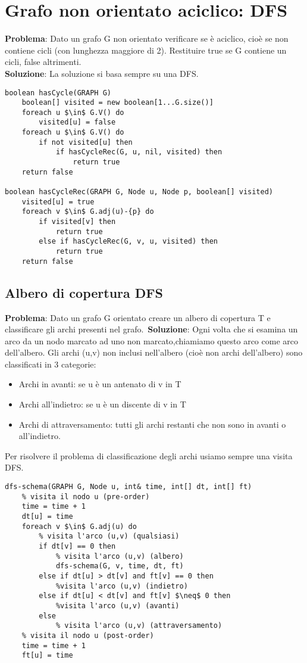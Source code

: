 \documentclass[../cheatSheetAlgoritmi.tex]{subfiles}
\begin{document}
\section{Grafo non orientato aciclico: DFS}
\textbf{Problema}: Dato un grafo G non orientato verificare se è aciclico, cioè se non contiene cicli (con lunghezza maggiore di 2). Restituire true se G contiene un cicli, false altrimenti.\\
\textbf{Soluzione}: La soluzione si basa sempre su una DFS. \
\begin{lstlisting}[caption= Grafo non orientato aciclico (hasCycle)]
boolean hasCycle(GRAPH G)
	boolean[] visited = new boolean[1...G.size()]
	foreach u $\in$ G.V() do
		visited[u] = false
	foreach u $\in$ G.V() do
		if not visited[u] then
			if hasCycleRec(G, u, nil, visited) then
				return true
	return false

boolean hasCycleRec(GRAPH G, Node u, Node p, boolean[] visited)
	visited[u] = true
	foreach v $\in$ G.adj(u)-{p} do
		if visited[v] then
			return true
		else if hasCycleRec(G, v, u, visited) then
			return true
	return false
\end{lstlisting}

\newpage
\subsection{Albero di copertura DFS}
\textbf{Problema}: Dato un grafo G orientato creare un albero di copertura T e classificare gli archi presenti nel grafo.\
\textbf{Soluzione}: Ogni volta che si esamina un arco da un nodo marcato ad uno non marcato,chiamiamo questo arco come arco dell'albero. Gli archi (u,v) non inclusi nell'albero (cioè non archi dell'albero) sono classificati in 3 categorie: 

\begin{itemize}
 	\item Archi in avanti: se u è un antenato di v in T
 	\item Archi all'indietro: se u è un discente di v in T
 	\item Archi di attraversamento: tutti gli archi restanti che non sono in avanti o all'indietro.
\end{itemize}
Per risolvere il problema di classificazione degli archi usiamo sempre una visita DFS.

\begin{lstlisting}[caption= Albero di copertura]
% time: contatore, dt: discovery time (tempo di scoperta del nodo), ft: finish time (tempo di fine visita del nodo e dei suoi archi)
dfs-schema(GRAPH G, Node u, int& time, int[] dt, int[] ft)
	% visita il nodo u (pre-order)
	time = time + 1
	dt[u] = time
	foreach v $\in$ G.adj(u) do
		% visita l'arco (u,v) (qualsiasi)
		if dt[v] == 0 then
			% visita l'arco (u,v) (albero)
			dfs-schema(G, v, time, dt, ft)
		else if dt[u] > dt[v] and ft[v] == 0 then
			%visita l'arco (u,v) (indietro)
		else if dt[u] < dt[v] and ft[v] $\neq$ 0 then
			%visita l'arco (u,v) (avanti)
		else
			% visita l'arco (u,v) (attraversamento) 
	% visita il nodo u (post-order)
	time = time + 1
	ft[u] = time
\end{lstlisting}
\end{document}

